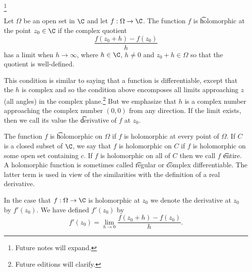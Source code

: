 
\footnote{Future notes will expand.}


Let $\Omega$ be an open set in $\C$ and let $f: \Omega \to \C$.
The function $f$ is \t{holomorphic at the point} $z_0 \in \C$ if the complex quotient
\[
  \frac{f(z_0 + h) - f(z_0)}{h}
\]
has a limit when $h \to \infty$, where $h \in \C$, $h \not= 0$ and $z_0 + h \in \Omega$ so that the quotient is well-defined.

This condition is similar to saying that a function is differentiable, except that the $h$ is complex and so the condition above encomposes all limits approaching $z$ (all angles) in the complex plane.\footnote{Future editions will clarify.}
But we emphasize that $h$ is a complex number approaching the complex number $(0, 0)$ from any direction.
If the limit exists, then we call its value the \t{derivative of $f$ at $z_0$}.

The function $f$ is \t{holomorphic} on $\Omega$ if $f$ is holomorphic at every point of $\Omega$.
If $C$ is a closed subset of $\C$, we say that $f$ is holomorphic on $C$ if $f$ is holomorphic on some open set containing $c$.
If $f$ is holomorphic on all of $C$ then we call $f$ \t{entire}.
A holomorphic function is sometimes called \t{regular} or \t{complex differentiable}.
The latter term is used in view of the similarities with the definition of a real derivative.


In the case that $f: \Omega \to \C$ is holomorphic at $z_0$ we denote the derivative at $z_0$ by $f'(z_0)$.
We have defined $f'(z_0)$ by
\[
  f'(z_0) = \lim_{h \to 0} \frac{f(z_0 + h) - f(z_0)}{h}.
\]
